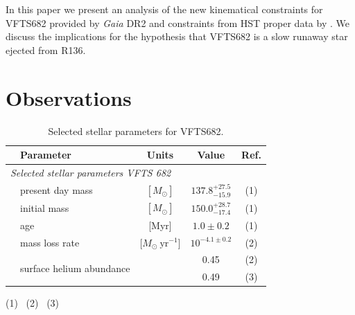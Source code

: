 \documentclass[apjl,twocolumn]{emulateapj}
\begin{document}

In this paper we present an analysis of the new kinematical
constraints for VFTS682 provided by \emph{Gaia} DR2 and constraints
from HST proper data  by \citet{platais:18}.   We discuss the
implications for the hypothesis that VFTS682 is a slow runaway star
ejected from R136.




\section{Observations}
\label{sec:sample}


\begin{table}
  \begin{center}
    \caption{Selected stellar parameters for VFTS682. }
    \begin{tabular}{llc|c|c}
      \hline
      \hline
      &Parameter & Units & Value & Ref.\\
     
       \hline
       \multicolumn{5}{l}{\emph{Selected stellar parameters VFTS 682}}
      \\
      \hline
     & present day mass  & $[M_\odot]$ & $137.8^{+27.5}_
                                           {-15.9}$ & (1)
                                                    \\
      & initial mass& $[M_\odot]$ & $150.0^{+28.7}_{-17.4}$ & (1)
      \\
      &age & [Myr] & $1.0\pm0.2$ & (1) \\
      &mass loss rate & [$M_\odot \ \mathrm{yr}^{-1}$] & $10^{-4.1\pm0.2}$ & (2)\\
      &\multirow{2}{*}{surface helium abundance} &  & 0.45 & (2)\\
      & &  & 0.49 & (3)\\
      \hline

    \end{tabular}
    \tablecomments
    { 
      (1)~\cite{schneider:18}
      (2)~\cite{bestenlehner:11}
      (3)~\cite{rubio-diez:17}
    }
  \end{center}
  \label{tab:star}
\end{table}
\end{document}
